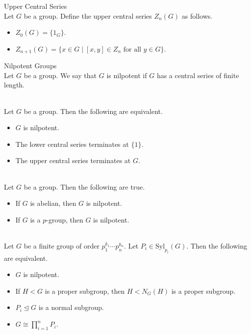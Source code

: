 \documentclass[a4paper]{article}
\begin{document}
\begin{defn}{Upper Central Series}{}\\
Let $G$ be a group. Define the upper central series $Z_n(G)$ as follows. 
\begin{itemize}
\item $Z_0(G)=\{1_G\}$. 
\item $Z_{n+1}(G)=\{x\in G\;|\;[x,y]\in Z_n\text{ for all }y\in G\}$. 
\end{itemize}
\end{defn}

\begin{defn}{Nilpotent Groups}{}\\
Let $G$ be a group. We say that $G$ is nilpotent if $G$ has a central series of finite length. 
\end{defn}

\begin{prp}{}{}\\
Let $G$ be a group. Then the following are equivalent. 
\begin{itemize}
\item $G$ is nilpotent. 
\item The lower central series terminates at $\{1\}$. 
\item The upper central series terminates at $G$. 
\end{itemize}
\end{prp}

\begin{lmm}{}{}\\
Let $G$ be a group. Then the following are true. 
\begin{itemize}
\item If $G$ is abelian, then $G$ is nilpotent. 
\item If $G$ is a $p$-group, then $G$ is nilpotent. 
\end{itemize}
\end{lmm}

\begin{prp}{}{}\\
Let $G$ be a finite group of order $p_1^{k_1}\cdots p_n^{k_n}$. Let $P_i\in\text{Syl}_{p_i}(G)$. Then the following are equivalent. 
\begin{itemize}
\item $G$ is nilpotent. 
\item If $H<G$ is a proper subgroup, then $H<N_G(H)$ is a proper subgroup. 
\item $P_i\trianglelefteq G$ is a normal subgroup. 
\item $G\cong\prod_{i=1}^nP_i$. 
\end{itemize}
\end{prp}
\end{document}
